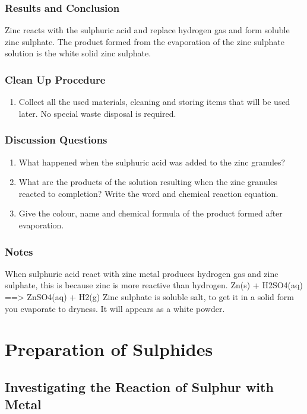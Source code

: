 \subsubsection*{Results and Conclusion}
Zinc reacts with the sulphuric acid and replace hydrogen gas and form soluble zinc sulphate. The product formed from the evaporation of the zinc sulphate solution is the white solid zinc sulphate.

\subsubsection*{Clean Up Procedure}
\begin{enumerate}
\item{Collect all the used materials, cleaning and storing items that will be used later. No special waste disposal is required.}
\end{enumerate}

\subsubsection*{Discussion Questions}
\begin{enumerate}
\item{What happened when the sulphuric acid was added to the zinc granules?}
\item{What are the products of the solution resulting when the zinc granules reacted to completion? Write the word and chemical reaction equation.}
\item{Give the colour, name and chemical formula of the product formed after evaporation.}
\end{enumerate}

\subsubsection*{Notes}
When sulphuric acid react with zinc metal produces hydrogen gas and zinc sulphate, this is because zinc is more reactive than hydrogen.
Zn(s) + H2SO4(aq) ==> ZnSO4(aq) + H2(g)
Zinc sulphate is soluble salt, to get it in a solid form you evaporate to dryness. It will appears as a white powder.

\section{Preparation of Sulphides}

\subsection{Investigating the Reaction of Sulphur with Metal}

